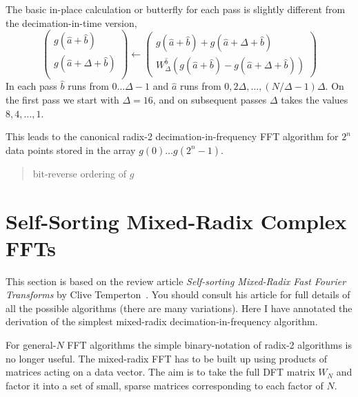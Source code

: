 \documentclass[fleqn,12pt]{article}
\newenvironment{algorithm}{\begin{quote} %
\begin{algorithmic}\samepage}{\end{algorithmic} %
\end{quote}}
\begin{document}
The basic in-place calculation or butterfly for each pass is slightly
different from the decimation-in-time version,
%
\begin{equation}
\left(
\begin{array}{c}
g({\hat a} + {\hat b}) \\
g({\hat a} + \Delta + {\hat b}) \\
\end{array}
\right)
\leftarrow
\left(
\begin{array}{c}
g({\hat a} + {\hat b}) +  g({\hat a} + \Delta + {\hat b})\\
W_{\Delta}^{\hat b} 
\left( g({\hat a} + {\hat b}) -  g({\hat a} + \Delta + {\hat b}) \right)
\end{array}
\right)
\end{equation}
%
In each pass ${\hat b}$ runs from $0 \dots \Delta-1$ and ${\hat
a}$ runs from $0, 2\Delta, \dots, (N/\Delta -1) \Delta$. On the first
pass we start with $\Delta=16$, and on subsequent passes $\Delta$ takes
the values $8, 4, \dots, 1$.

This leads to the canonical radix-2 decimation-in-frequency FFT
algorithm for $2^n$ data points stored in the array $g(0) \dots
g(2^n-1)$.
%
\begin{algorithm}
    \ENDFOR
  \ENDFOR
\ENDFOR
\STATE bit-reverse ordering of $g$
\end{algorithm}
%

\section{Self-Sorting Mixed-Radix Complex FFTs}
%
This section is based on the review article {\em Self-sorting
Mixed-Radix Fast Fourier Transforms} by Clive
Temperton~\cite{temperton83}. You should consult his article for full
details of all the possible algorithms (there are many
variations). Here I have annotated the derivation of the simplest
mixed-radix decimation-in-frequency algorithm.

For general-$N$ FFT algorithms the simple binary-notation of radix-2
algorithms is no longer useful.  The mixed-radix FFT has to be built
up using products of matrices acting on a data vector.  The aim is to
take the full DFT matrix $W_N$ and factor it into a set of small,
sparse matrices corresponding to each factor of $N$.
\end{document}

